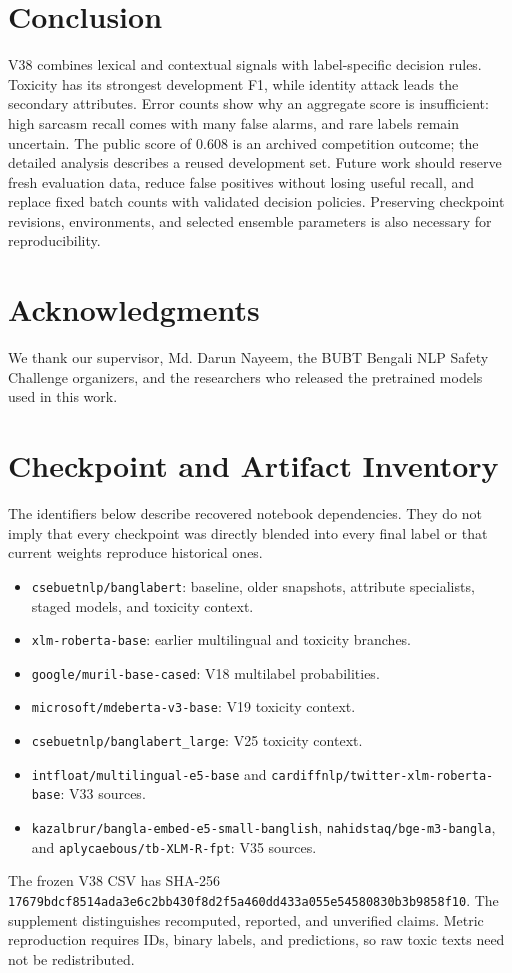 \documentclass[10pt,a4paper]{article}
\newcommand{\checkpoint}[1]{{\small\nolinkurl{#1}}}
\begin{document}
\section{Conclusion}
V38 combines lexical and contextual signals with label-specific decision rules. Toxicity has its strongest development F1, while identity attack leads the secondary attributes. Error counts show why an aggregate score is insufficient: high sarcasm recall comes with many false alarms, and rare labels remain uncertain. The public score of 0.608 is an archived competition outcome; the detailed analysis describes a reused development set. Future work should reserve fresh evaluation data, reduce false positives without losing useful recall, and replace fixed batch counts with validated decision policies. Preserving checkpoint revisions, environments, and selected ensemble parameters is also necessary for reproducibility.

\section*{Acknowledgments}
We thank our supervisor, Md. Darun Nayeem, the BUBT Bengali NLP Safety Challenge organizers, and the researchers who released the pretrained models used in this work.



\appendix
\section{Checkpoint and Artifact Inventory}\label{app:checkpoints}
The identifiers below describe recovered notebook dependencies. They do not imply that every checkpoint was directly blended into every final label or that current weights reproduce historical ones.
\begin{itemize}
\item \checkpoint{csebuetnlp/banglabert}: baseline, older snapshots, attribute specialists, staged models, and toxicity context.
\item \checkpoint{xlm-roberta-base}: earlier multilingual and toxicity branches.
\item \checkpoint{google/muril-base-cased}: V18 multilabel probabilities.
\item \checkpoint{microsoft/mdeberta-v3-base}: V19 toxicity context.
\item \checkpoint{csebuetnlp/banglabert_large}: V25 toxicity context.
\item \checkpoint{intfloat/multilingual-e5-base} and \checkpoint{cardiffnlp/twitter-xlm-roberta-base}: V33 sources.
\item \checkpoint{kazalbrur/bangla-embed-e5-small-banglish}, \checkpoint{nahidstaq/bge-m3-bangla}, and \checkpoint{aplycaebous/tb-XLM-R-fpt}: V35 sources.
\end{itemize}
The frozen V38 CSV has SHA-256 \nolinkurl{17679bdcf8514ada3e6c2bb430f8d2f5a460dd433a055e54580830b3b9858f10}. The supplement distinguishes recomputed, reported, and unverified claims. Metric reproduction requires IDs, binary labels, and predictions, so raw toxic texts need not be redistributed.
\end{document}
